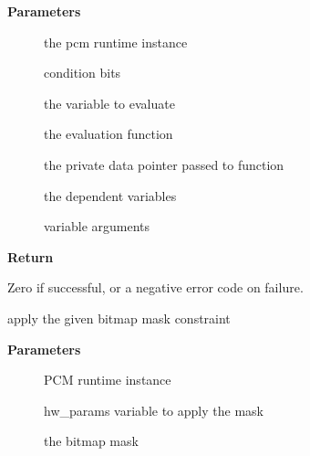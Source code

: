 \documentclass[a4paper,8pt,english]{sphinxmanual}
\begin{document}
\textbf{Parameters}
\begin{description}
\item[{}] \leavevmode
the pcm runtime instance

\item[{}] \leavevmode
condition bits

\item[{}] \leavevmode
the variable to evaluate

\item[{}] \leavevmode
the evaluation function

\item[{}] \leavevmode
the private data pointer passed to function

\item[{}] \leavevmode
the dependent variables

\item[{}] \leavevmode
variable arguments

\end{description}

\textbf{Return}

Zero if successful, or a negative error code on failure.

\begin{fulllineitems}
\label{sound/kernel-api/alsa-driver-api:c.snd_pcm_hw_constraint_mask}
apply the given bitmap mask constraint

\end{fulllineitems}


\textbf{Parameters}
\begin{description}
\item[{}] \leavevmode
PCM runtime instance

\item[{}] \leavevmode
hw\_params variable to apply the mask

\item[{}] \leavevmode
the bitmap mask

\end{description}
\end{document}
